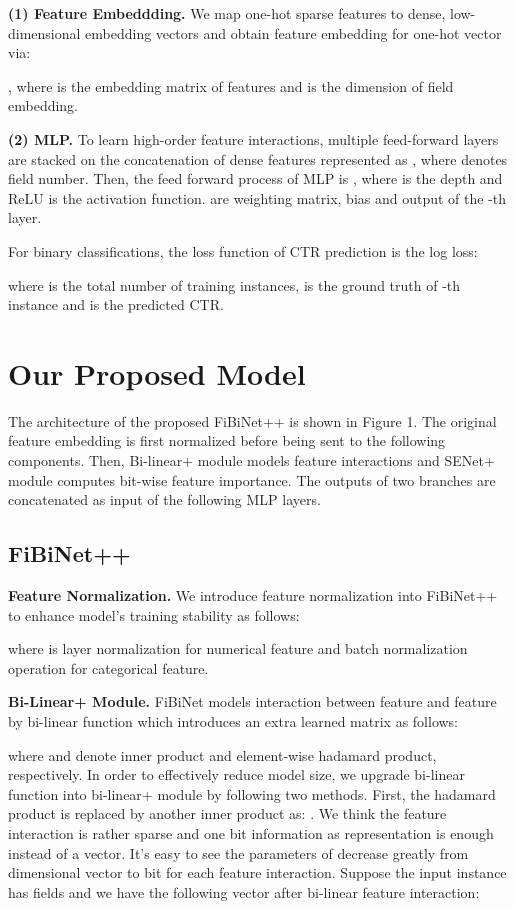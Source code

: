 \documentclass[sigconf]{acmart}
\begin{document}
\textbf{(1) Feature Embeddding.}
We map one-hot sparse features to dense, low-dimensional embedding vectors and obtain feature embedding  for one-hot vector  via:

, where  is the embedding matrix of  features and  is the dimension of field embedding.


\textbf{(2) MLP.}
To learn high-order feature interactions, multiple feed-forward layers are stacked on the concatenation of dense features represented as  , where  denotes field number. Then, the feed forward process of MLP is 
 , where  is the depth and ReLU is the activation function.  are weighting matrix, bias and output of the -th layer. 

For binary classifications, the loss function of CTR prediction is the log loss:

where  is the total number of training instances,  is the ground truth of -th instance and  is the predicted CTR.  

\section{Our Proposed Model}
The architecture of the proposed FiBiNet++ is shown in Figure 1. The original feature embedding is first normalized before being sent to the following components. Then, Bi-linear+ module models feature interactions and SENet+ module computes bit-wise feature importance. The outputs of two branches are concatenated as input of the following MLP layers.
\subsection{FiBiNet++}

\textbf{Feature Normalization.}
We introduce feature normalization into FiBiNet++ to enhance model's training stability as follows:

where   is layer normalization\cite{ln2016} for numerical feature and batch normalization\cite{bn2015} operation for categorical feature.

\textbf{Bi-Linear+ Module.}
FiBiNet models interaction between feature  and feature  by bi-linear function which introduces an extra learned matrix  as follows:

where  and  denote inner product and element-wise hadamard product, respectively. In order to effectively reduce model size, we upgrade bi-linear function into bi-linear+ module by following two methods. First, the hadamard product is replaced by another inner product as: 
. We think the feature interaction is rather sparse and one bit information as representation is enough instead of a vector. It's easy to see the parameters of  decrease greatly from   dimensional vector to  bit for each feature interaction. Suppose the input instance has  fields and we have the following  vector after bi-linear feature interaction:
\end{document}
